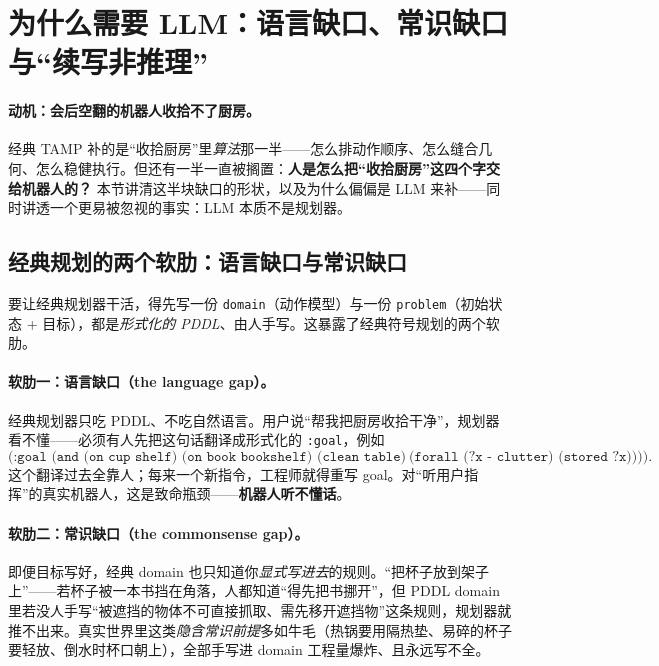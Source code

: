 \section{为什么需要 LLM：语言缺口、常识缺口与“续写非推理”}
\label{sec:llm-why}

\paragraph{动机：会后空翻的机器人收拾不了厨房。}
经典 TAMP 补的是“收拾厨房”里\emph{算法}那一半——怎么排动作顺序、怎么缝合几何、怎么稳健执行。但还有一半一直被搁置：\textbf{人是怎么把“收拾厨房”这四个字交给机器人的？} 本节讲清这半块缺口的形状，以及为什么偏偏是 LLM 来补——同时讲透一个更易被忽视的事实：LLM 本质不是规划器。

\subsection{经典规划的两个软肋：语言缺口与常识缺口}
\label{sec:llm-gaps}

要让经典规划器干活，得先写一份 \texttt{domain}（动作模型）与一份 \texttt{problem}（初始状态 + 目标），都是\emph{形式化的 PDDL}、由人手写。这暴露了经典符号规划的两个软肋。

\paragraph{软肋一：语言缺口（the language gap）。}
经典规划器只吃 PDDL、不吃自然语言。用户说“帮我把厨房收拾干净”，规划器看不懂——必须有人先把这句话翻译成形式化的 \texttt{:goal}，例如
\[
\texttt{(:goal (and (on cup shelf) (on book bookshelf) (clean table)}\ \texttt{(forall (?x - clutter) (stored ?x))))}.
\]
这个翻译过去全靠人；每来一个新指令，工程师就得重写 goal。对“听用户指挥”的真实机器人，这是致命瓶颈——\textbf{机器人听不懂话}。

\paragraph{软肋二：常识缺口（the commonsense gap）。}
即便目标写好，经典 domain 也只知道你\emph{显式写进去}的规则。“把杯子放到架子上”——若杯子被一本书挡在角落，人都知道“得先把书挪开”，但 PDDL domain 里若没人手写“被遮挡的物体不可直接抓取、需先移开遮挡物”这条规则，规划器就推不出来。真实世界里这类\emph{隐含常识前提}多如牛毛（热锅要用隔热垫、易碎的杯子要轻放、倒水时杯口朝上），全部手写进 domain 工程量爆炸、且永远写不全。

